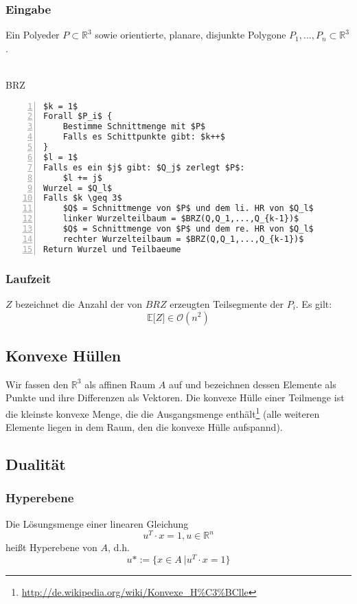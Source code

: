 \subsubsection{Eingabe}
Ein Polyeder \(P \subset \mathbb{R}^3\) sowie orientierte, planare, disjunkte Polygone \(P_1,...,P_n \subset \mathbb{R}^3\).
\\\\
\begin{minipage}{\textwidth}
BRZ
\begin{lstlisting}[frame=single,numbers=left,mathescape]
$k = 1$
Forall $P_i$ {
	Bestimme Schnittmenge mit $P$
	Falls es Schittpunkte gibt: $k++$
}
$l = 1$
Falls es ein $j$ gibt: $Q_j$ zerlegt $P$:
	$l += j$
Wurzel = $Q_l$
Falls $k \geq 3$
	$Q$ = Schnittmenge von $P$ und dem li. HR von $Q_l$
	linker Wurzelteilbaum = $BRZ(Q,Q_1,...,Q_{k-1})$
	$Q$ = Schnittmenge von $P$ und dem re. HR von $Q_l$
	rechter Wurzelteilbaum = $BRZ(Q,Q_1,...,Q_{k-1})$
Return Wurzel und Teilbaeume
\end{lstlisting}
\end{minipage}


\subsubsection{Laufzeit}
\(Z\) bezeichnet die Anzahl der von \(BRZ\) erzeugten Teilsegmente der \(P_i\). Es gilt:
\[\mathbb{E}\lbrack Z \rbrack \in \mathcal{O}(n^2)\]


\subsection{Konvexe Hüllen}
Wir fassen den \(\mathbb{R}^3\) als affinen Raum \(A\) auf und bezeichnen dessen Elemente als Punkte und ihre Differenzen als Vektoren. Die konvexe Hülle einer Teilmenge ist die kleinste konvexe Menge, die die Ausgangsmenge enthält\footnote{\url{http://de.wikipedia.org/wiki/Konvexe_H\%C3\%BClle}} (alle weiteren Elemente liegen in dem Raum, den die konvexe Hülle aufspannd).


\subsection{Dualität}

\subsubsection{Hyperebene}
Die Lösungsmenge einer linearen Gleichung
\[u^T \cdot x = 1, u \in \mathbb{R}^n\]
heißt Hyperebene von \(A\), d.h.
\[u* := \{x \in A~|u^T \cdot x = 1\}\]

